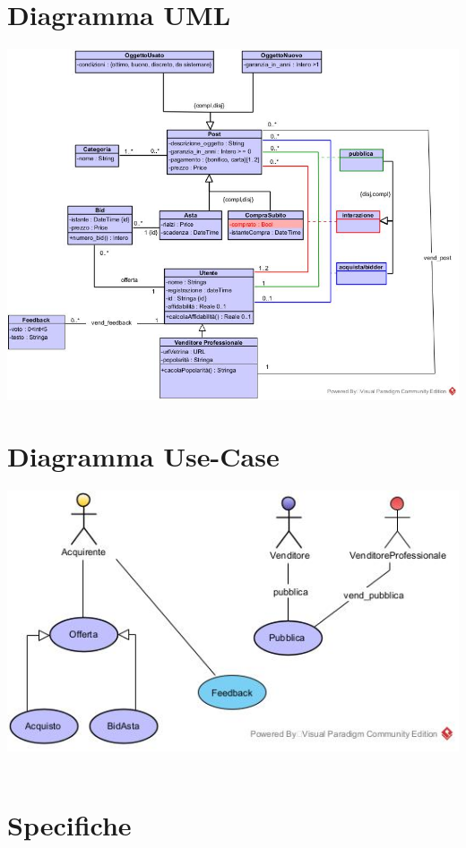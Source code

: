 \documentclass[12pt, letterpaper]{article}
\newcommand{\acc}{\\\hphantom{}\\}
\begin{document}
\section{Diagramma UML}\begin{center}
    \includegraphics[width=\textwidth ]{UML.jpg}
\end{center}
\newpage
\section{Diagramma Use-Case}\begin{center}
    \includegraphics[width=\textwidth ]{useCase.jpg}\acc
\end{center}

\section{Specifiche}
\end{document}
